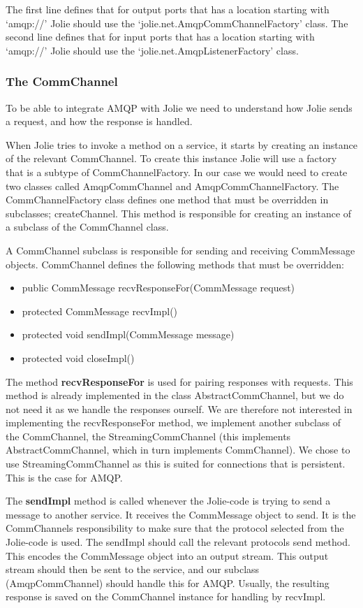 The first line defines that for output ports that has a location starting with `amqp://' Jolie should use the `jolie.net.AmqpCommChannelFactory' class.
The second line defines that for input ports that has a location starting with `amqp://' Jolie should use the `jolie.net.AmqpListenerFactory' class.

\subsubsection{The CommChannel}
To be able to integrate AMQP with Jolie we need to understand how Jolie sends a request, and how the response is handled.

When Jolie tries to invoke a method on a service, it starts by creating an instance of the relevant CommChannel. To create this instance Jolie will use a factory that is a subtype of CommChannelFactory. In our case we would need to create two classes called AmqpCommChannel and AmqpCommChannelFactory. The CommChannelFactory class defines one method that must be overridden in subclasses; createChannel. This method is responsible for creating an instance of a subclass of the CommChannel class.

A CommChannel subclass is responsible for sending and receiving CommMessage objects. CommChannel defines the following methods that must be overridden:
\begin{itemize}
  \item public CommMessage recvResponseFor(CommMessage request)
  \item protected CommMessage recvImpl()
  \item protected void sendImpl(CommMessage message)
  \item protected void closeImpl()
\end{itemize}

The method \textbf{recvResponseFor} is used for pairing responses with requests. This method is already implemented in the class AbstractCommChannel, but we do not need it as we handle the responses ourself. We are therefore not interested in implementing the recvResponseFor method, we implement another subclass of the CommChannel, the StreamingCommChannel (this implements AbstractCommChannel, which in turn implements CommChannel). We chose to use StreamingCommChannel as this is suited for connections that is persistent. This is the case for AMQP.

The \textbf{sendImpl} method is called whenever the Jolie-code is trying to send a message to another service. It receives the CommMessage object to send. It is the CommChannels responsibility to make sure that the protocol selected from the Jolie-code is used. The sendImpl should call the relevant protocols send method. This encodes the CommMessage object into an output stream. This output stream should then be sent to the service, and our subclass (AmqpCommChannel) should handle this for AMQP. Usually, the resulting response is saved on the CommChannel instance for handling by recvImpl.


